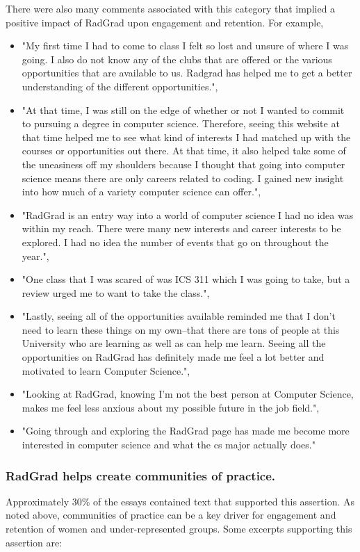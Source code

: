 \documentclass[acmsmall,nonacm]{acmart}
\begin{document}
There were also many comments associated with this category that implied a positive impact of RadGrad upon engagement and retention. For example,
\begin{itemize}[leftmargin=*]
\item "My first time I had to come to class I felt so lost and unsure of where I was going. I also do not know any of the clubs that are offered or the various opportunities that are available to us. Radgrad has helped me to get a better understanding of the different opportunities.",
\item "At that time, I was still on the edge of whether or not I wanted to commit to pursuing a degree in computer science. Therefore, seeing this website at that time helped me to see what kind of interests I had matched up with the courses or opportunities out there. At that time, it also helped take some of the uneasiness off my shoulders because I thought that going into computer science means there are only careers related to coding. I gained new insight into how much of a variety computer science can offer.",
\item "RadGrad is an entry way into a world of computer science I had no idea was within my reach. There were many new interests and career interests to be explored. I had no idea the number of events that go on throughout the year.",
\item "One class that I was scared of was ICS 311 which I was going to take, but a review urged me to want to take the class.",
\item "Lastly, seeing all of the opportunities available reminded me that I don't need to learn these things on my own--that there are tons of people at this University who are learning as well as can help me learn. Seeing all the opportunities on RadGrad has definitely made me feel a lot better and motivated to learn Computer Science.",
\item "Looking at RadGrad, knowing I'm not the best person at Computer Science, makes me feel less anxious about my possible future in the job field.",
\item "Going through and exploring the RadGrad page has made me become more interested in computer science and what the cs major actually does."
\end{itemize}

\subsubsection{RadGrad helps create communities of practice.} Approximately 30\% of the essays contained text that supported this assertion. As noted above, communities of practice can be a key driver for engagement and retention of women and under-represented groups. Some excerpts supporting this assertion are:
\end{document}
